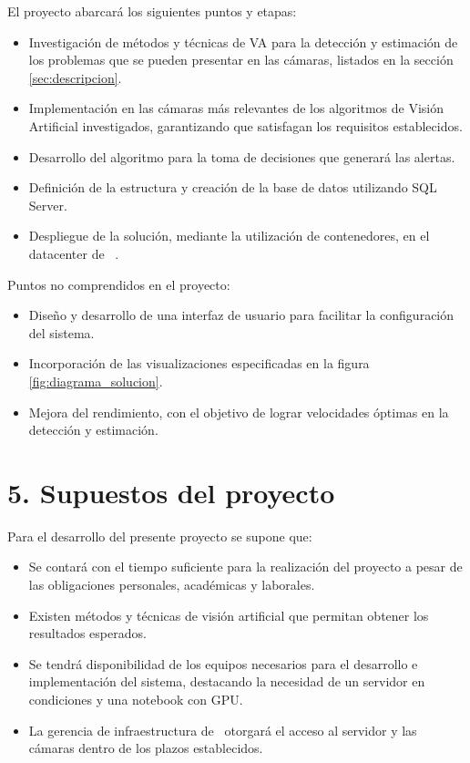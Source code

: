\documentclass[
11pt, %
]{charter}
\begin{document}
El proyecto abarcará los siguientes puntos y etapas:

\begin{itemize}
	\item Investigación de métodos y técnicas de VA para la detección y estimación de los problemas que se pueden presentar en las cámaras, listados en la sección \ref{sec:descripcion}.
	\item Implementación en las cámaras más relevantes de los algoritmos de Visión Artificial investigados, garantizando que satisfagan los requisitos establecidos. 
	\item Desarrollo del algoritmo para la toma de decisiones que generará las alertas.
	\item Definición de la estructura y creación de la base de datos utilizando SQL Server.
	\item Despliegue de la solución, mediante la utilización de contenedores, en el datacenter de \empclientename \ .
\end{itemize}

Puntos no comprendidos en el proyecto:

\begin{itemize}
	\item Diseño y desarrollo de una interfaz de usuario para facilitar la configuración del sistema.
	\item Incorporación de las visualizaciones especificadas en la figura \ref{fig:diagrama_solucion}.
	\item Mejora del rendimiento, con el objetivo de lograr velocidades óptimas en la detección y estimación.
\end{itemize}


\section{5. Supuestos del proyecto}
\label{sec:supuestos}

Para el desarrollo del presente proyecto se supone que:

\begin{itemize}
	\item Se contará con el tiempo suficiente para la realización del proyecto a pesar de las obligaciones personales, académicas y laborales.
	\item Existen métodos y técnicas de visión artificial que permitan obtener los resultados esperados.
	\item Se tendrá disponibilidad de los equipos necesarios para el desarrollo e implementación del sistema, destacando la necesidad de un servidor en condiciones y una notebook con GPU.
	\item La gerencia de infraestructura de \empclientename \ otorgará el acceso al servidor y las cámaras dentro de los plazos establecidos.
\end{itemize}
\end{document}
